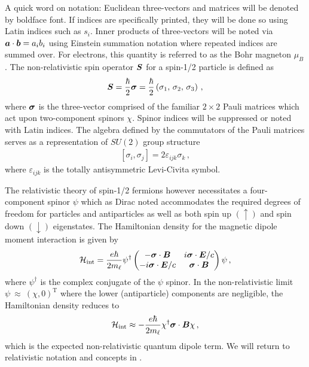 A quick word on notation: Euclidean three-vectors and matrices will be denoted by boldface font. If indices are specifically printed, they will be done so using Latin indices such as $s_{i}$. Inner products of three-vectors will be noted via $\boldsymbol{a}\cdot\boldsymbol{b}=a_{i}b_{i}$ using Einstein summation notation where repeated indices are summed over. For electrons, this quantity is referred to as the Bohr magneton $\mu_{B}$. The non-relativistic spin operator $\boldsymbol{S}$ for a spin-1/2 particle is defined as
\begin{gather}
    \label{qspin:1}
    \boldsymbol{S}=\frac{\hbar}{2}\boldsymbol{\sigma}=\frac{\hbar}{2}\left(\sigma_{1},\,\sigma_{2},\,\sigma_{3}\right)\,,
\end{gather}
where $\boldsymbol{\sigma}$ is the three-vector comprised of the familiar $2\times2$ Pauli matrices which act upon two-component spinors $\chi$. Spinor indices will be suppressed or noted with Latin indices. The algebra defined by the commutators of the Pauli matrices serves as a representation of $SU(2)$ group structure
\begin{gather}
    \label{pauli:1}
    [\sigma_{i},\sigma_{j}] = 2\varepsilon_{ijk}\sigma_{k}\,,
\end{gather}
where $\varepsilon_{ijk}$ is the totally antisymmetric Levi-Civita symbol.

The relativistic theory of spin-1/2 fermions however necessitates a four-component spinor $\psi$ which as Dirac noted accommodates the required degrees of freedom for particles and antiparticles as well as both spin up $(\uparrow)$ and spin down $(\downarrow)$ eigenstates. The Hamiltonian density for the magnetic dipole moment interaction is given by
\begin{gather}
	\label{pauli:2}
    \mathcal{H}_\mathrm{int} = \frac{e\hbar}{2m_{\ell}}\psi^{\dag}
    \begin{pmatrix}
        -\boldsymbol{\sigma}\cdot\boldsymbol{B} & i\boldsymbol{\sigma}\cdot\boldsymbol{E}/c\\
        -i\boldsymbol{\sigma}\cdot\boldsymbol{E}/c & \boldsymbol{\sigma}\cdot\boldsymbol{B}
    \end{pmatrix}
    \psi\,,
\end{gather}
where $\psi^{\dag}$ is the complex conjugate of the $\psi$ spinor. In the non-relativistic limit $\psi~\approx~(\chi,0)^\mathrm{T}$ where the lower (antiparticle) components are negligible, the Hamiltonian density  reduces to 
\begin{gather}
	\label{pauli:3}
    \mathcal{H}_\mathrm{int} \approx - \frac{e\hbar}{2m_{\ell}}\chi^{\dag}\boldsymbol{\sigma}\cdot\boldsymbol{B}\chi\,,
\end{gather}
which is the expected non-relativistic quantum dipole term. We will return to relativistic notation and concepts in .

